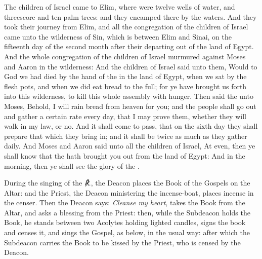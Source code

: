  The children of Israel came to Elim, where were twelve wells of water, and threescore and ten palm trees: and they encamped there by the waters. And they took their journey from Elim, and all the congregation of the children of Israel came unto the wilderness of Sin, which is between Elim and Sinai, on the fifteenth day of the second month after their departing out of the land of Egypt. And the whole congregation of the children of Israel murmured against Moses and Aaron in the wilderness: And the children of Israel said unto them, Would to God we had died by the hand of the  in the land of Egypt, when we sat by the flesh pots, and when we did eat bread to the full; for ye have brought us forth into this wilderness, to kill this whole assembly with hunger. Then said the  unto Moses, Behold, I will rain bread from heaven for you; and the people shall go out and gather a certain rate every day, that I may prove them, whether they will walk in my law, or no. And it shall come to pass, that on the sixth day they shall prepare that which they bring in; and it shall be twice as much as they gather daily. And Moses and Aaron said unto all the children of Israel, At even, then ye shall know that the  hath brought you out from the land of Egypt: And in the morning, then ye shall see the glory of the .
\begin{rubric}
    During the singing of the \emph{℟.}, the Deacon places the Book of the Gospels on the Altar: and the Priest, the Deacon ministering the incense-boat, places incense in the censer. Then the Deacon says: \emph{Cleanse my heart}, takes the Book from the Altar, and asks a blessing from the Priest: then, while the Subdeacon holds the Book, he stands between two Acolytes holding lighted candles, signs the book and censes it, and sings the Gospel, as below, in the usual way: after which the Subdeacon carries the Book to be kissed by the Priest, who is censed by the Deacon.
\end{rubric}
